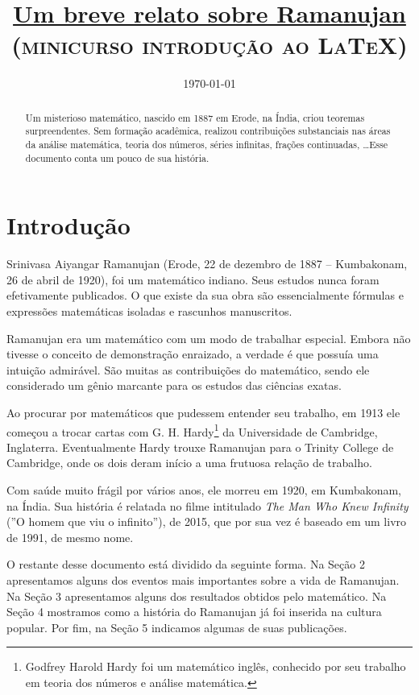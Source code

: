 \documentclass[12pt, a4paper]{article}
\title{\textbf{\underline{Um breve relato sobre Ramanujan}}\\
\textsc{(minicurso introdução ao \LaTeX})}
\date{\today}
\begin{document}
\maketitle

\begin{abstract}
\indent 
Um misterioso matemático, nascido em 1887 em Erode, na Índia, criou
teoremas surpreendentes. Sem formação acadêmica, realizou contribuições
substanciais nas áreas da análise matemática, teoria dos números, séries
infinitas, frações continuadas, \ldots Esse documento conta um pouco de 
sua história.
\end{abstract}

\section{Introdução}

\noindent 
Srinivasa Aiyangar Ramanujan (Erode, 22 de dezembro de 1887 -- Kumbakonam, 26 
de abril de 1920), foi um matemático indiano.  Seus estudos nunca foram 
efetivamente publicados.  O que existe da sua obra são essencialmente fórmulas 
e expressões matemáticas isoladas e rascunhos manuscritos.

Ramanujan era um matemático com um modo de trabalhar especial.  Embora não
tivesse o conceito de demonstração enraizado, a verdade é que possuía uma
intuição admirável.  São muitas as contribuições do matemático, sendo ele
considerado um gênio marcante para os estudos das ciências exatas.

Ao procurar por matemáticos que pudessem entender seu trabalho, em 1913 ele
começou a trocar cartas com G. H. Hardy\footnote{Godfrey Harold Hardy foi um 
matemático inglês, conhecido por seu trabalho em teoria dos números e análise 
matemática.} da Universidade de Cambridge, Inglaterra.  Eventualmente Hardy 
trouxe Ramanujan para o Trinity College de
Cambridge, onde os dois deram início a uma frutuosa relação de trabalho.

Com saúde muito frágil por vários anos, ele morreu em 1920, em Kumbakonam, na
Índia.  Sua história é relatada no filme intitulado \textit{The Man Who Knew 
Infinity} (''O homem que viu o infinito''), de 2015, que por sua vez é baseado 
em um livro de 1991, de mesmo nome.

O restante desse documento está dividido da seguinte forma. Na Seção 2
apresentamos alguns dos eventos mais importantes sobre a vida de Ramanujan. Na
Seção 3 apresentamos alguns dos resultados obtidos pelo matemático. Na Seção 4
mostramos como a história do Ramanujan já foi inserida na cultura popular. Por
fim, na Seção 5 indicamos algumas de suas publicações.
\end{document}
